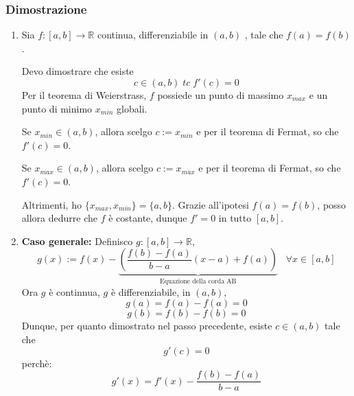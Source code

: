 \documentclass[a4paper]{article}
\theoremstyle{break}
\theoremstyle{break}
\theoremstyle{break}
\theoremstyle{break}
\begin{document}
\subsubsection{Dimostrazione}
\begin{enumerate}
  \item 
    Sia \( f: [a,b] \to \mathbb{R} \) continua, differenziabile in \( (a,b) \) , tale
    che \( f(a)=f(b) \).

    Devo dimostrare che esiste \[ c \in (a,b)\;tc\; f'(c)=0 \]
    Per il teorema di Weierstrass, \( f \) possiede un punto di massimo \( x_{max} \) 
    e un punto di minimo \( x_{min} \) globali. 

    Se \( x_{min} \in (a,b) \), allora scelgo \( c:= x_{min} \) e per il teorema di Fermat,
    so che \( f'(c)=0 \).

    Se \( x_{max} \in (a,b) \), allora scelgo \( c:=x_{max} \) e per il teorema di Fermat,
    so che \( f'(c)=0 \).

    Altrimenti, ho \( \{x_{max},x_{min}\}= \{a,b\}   \). Grazie all'ipotesi \( f(a)=f(b) \),
    posso allora dedurre che \( f \) è costante, dunque \( f'=0 \) in tutto \( [a,b] \).
  \item \textbf{Caso generale:}
    Definisco \( g: [a,b] \to \mathbb{R} \),
    \[
      g(x):= f(x)-\underbrace{\left(\frac{f(b)-f(a)}{b-a}(x-a)+f(a)\right)}_{\text{Equazione della corda AB}}\;\;\;\forall x \in [a,b]
    \] 
    Ora \( g \) è continnua, \( g \) è differenziabile, in \( (a,b) \),
    \[
    g(a)=f(a) - f(a) = 0
    \] 
    \[
    g(b) = f(b) -f(b) = 0
    \] 
    Dunque, per quanto dimostrato nel passo precedente, esiste \( c \in (a,b) \) tale che
    \[
    g'(c)=0
    \] 
    perchè:
    \[
    g'(x) = f'(x) - \frac{f(b)-f(a)}{b-a}
    \] 
\end{enumerate}
\end{document}
